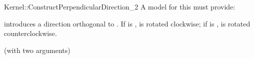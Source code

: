 \begin{ccRefFunctionObjectConcept}{Kernel::ConstructPerpendicularDirection_2}
A model for this must provide:


            {introduces a direction orthogonal to . If  is
             ,  is rotated clockwise; if  is
             ,  is rotated counterclockwise.
             }

\ccRefines
{} (with two arguments)

\ccSeeAlso
{} \\

\end{ccRefFunctionObjectConcept}
